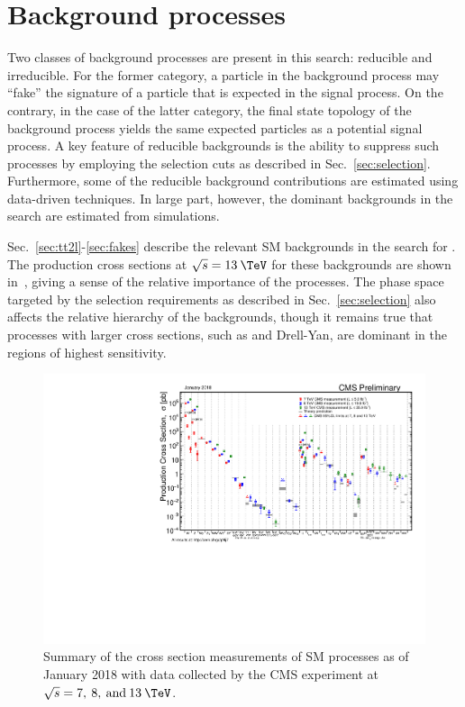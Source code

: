 \chapter{Background processes}
\label{chap:backgrounds}

Two classes of background processes are present in this search: reducible and irreducible. For the former category, a particle in the background process may ``fake'' the signature of a particle that is expected in the signal process. On the contrary, in the case of the latter category, the final state topology of the background process yields the same expected particles as a potential signal process. A key feature of reducible backgrounds is the ability to suppress such processes by employing the selection cuts as described in Sec.~\ref{sec:selection}. Furthermore, some of the reducible background contributions are estimated using data-driven techniques. In large part, however, the dominant backgrounds in the search are estimated from simulations.

Sec.~\ref{sec:tt2l}-\ref{sec:fakes} describe the relevant SM backgrounds in the search for \ttllDM. The production cross sections at $\sqrt{s}=13\:\TeV$ for these backgrounds are shown in~, giving a sense of the relative importance of the processes. The phase space targeted by the selection requirements as described in Sec.~\ref{sec:selection} also affects the relative hierarchy of the backgrounds, though it remains true that processes with larger cross sections, such as \ttbar and Drell-Yan, are dominant in the regions of highest sensitivity.

\begin{figure}
  \begin{center}
    \includegraphics[width=\textwidth]{figs/SigmaNew_v0.pdf}
    \caption{Summary of the cross section measurements of SM processes as of January 2018 with data collected by the CMS experiment at $\sqrt{s}=7,\:8,\:\text{and}\: 13\:\TeV$. }
    \label{fig:SMxsec}
  \end{center}
\end{figure}


